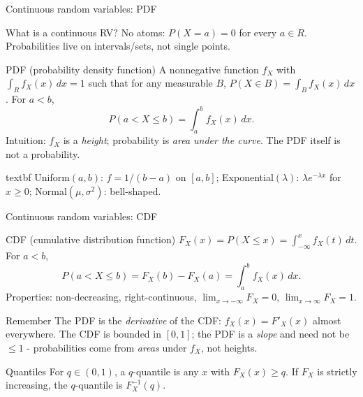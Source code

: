\documentclass{beamer}
\def\textemdash{-}%
\def\P{P}%
\def\mathbb#1{#1}%
\newcommand{\R}{\mathbb{R}}
\renewcommand{\P}{\mathbb{P}}
\newcommand{\1}{\mathbf{1}}
\newcommand{\robustcmd}[1]{\csname #1\endcsname}
\providecommand{\textbf}[1]{\robustcmd{textbf}{#1}}
\begin{document}
\begin{frame}{Continuous random variables: PDF}{}
  \begin{block}{What is a continuous RV?}
    No atoms: $\P(X=a)=0$ for every $a\in\R$. Probabilities live on intervals/sets, not single points.
  \end{block}

  \begin{block}{PDF (probability density function)}
    A nonnegative function $f_X$ with $\int_{\R} f_X(x)\,dx=1$ such that for any measurable $B$, $\P(X\in B)=\int_B f_X(x)\,dx$. For $a<b$,
    {\scriptsize\[
        \P(a< X\le b)=\int_a^b f_X(x)\,dx.
    \]}
    Intuition: $f_X$ is a \emph{height}; probability is \emph{area under the curve}. The PDF itself is not a probability.
  \end{block}

  \textbf{Examples:} Uniform$(a,b)$: $f=1/(b-a)$ on $[a,b]$; Exponential$(\lambda)$: $\lambda e^{-\lambda x}$ for $x\ge0$; Normal$(\mu,\sigma^2)$: bell-shaped.
\end{frame}

\begin{frame}{Continuous random variables: CDF}{}
  {\small
    \begin{block}{CDF (cumulative distribution function)}
      $F_X(x)=\P(X\le x)=\int_{-\infty}^{x} f_X(t)\,dt$. For $a<b$,
      {\scriptsize\[
          \P(a< X\le b)=F_X(b)-F_X(a)=\int_a^b f_X(x)\,dx.
      \]}
      Properties: non-decreasing, right-continuous, $\lim_{x\to-\infty}F_X=0$, $\lim_{x\to\infty}F_X=1$.
    \end{block}
    \vspace{-0.5em}
    \begin{alertblock}{Remember}
      The PDF is the \emph{derivative} of the CDF: $f_X(x)=F'_X(x)$ almost everywhere. The CDF is bounded in $[0,1]$; the PDF is a \emph{slope} and need not be $\le 1$ \textemdash{} probabilities come from \emph{areas} under $f_X$, not heights.
    \end{alertblock}
    \vspace{-0.5em}
    \begin{block}{Quantiles}
      For $q\in(0,1)$, a $q$-quantile is any $x$ with $F_X(x)\ge q$. If $F_X$ is strictly increasing, the $q$-quantile is $F_X^{-1}(q)$.
    \end{block}
  }
\end{frame}
\end{document}
